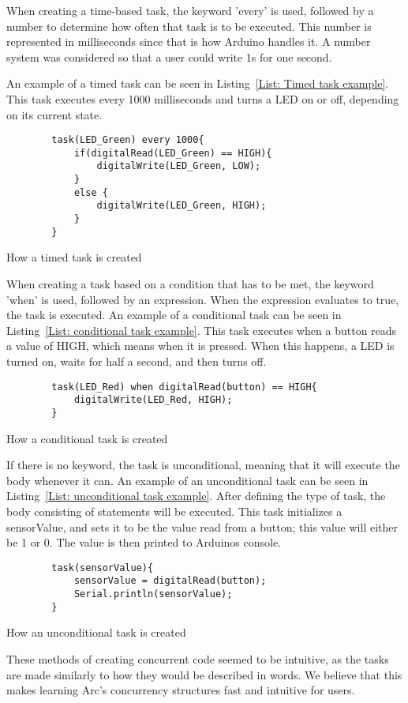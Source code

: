 When creating a time-based task, the keyword 'every' is used, followed by a number to determine how often that task is to be executed. This number is represented in milliseconds since that is how Arduino handles it. A number system was considered so that a user could write 1s for one second.

An example of a timed task can be seen in Listing~\ref{List: Timed task example}. This task executes every 1000 milliseconds and turns a LED on or off, depending on its current state.


\begin{listing}[htb!]
    \begin{verbatim}
        task(LED_Green) every 1000{
            if(digitalRead(LED_Green) == HIGH){
                digitalWrite(LED_Green, LOW);
            }
            else {
                digitalWrite(LED_Green, HIGH);
            }
        }
    \end{verbatim}
    \caption{How a timed task is created}
    \label{List: Timed task example}
\end{listing}


When creating a task based on a condition that has to be met, the keyword 'when' is used, followed by an expression. When the expression evaluates to true, the task is executed. An example of a conditional task can be seen in Listing~\ref{List: conditional task example}. This task executes when a button reads a value of HIGH, which means when it is pressed. When this happens, a LED is turned on, waits for half a second, and then turns off.


\begin{listing}[htb!]
    \begin{verbatim}
        task(LED_Red) when digitalRead(button) == HIGH{
            digitalWrite(LED_Red, HIGH);
        }
    \end{verbatim}
    \caption{How a conditional task is created}
    \label{List: conditional task example}
\end{listing}


If there is no keyword, the task is unconditional, meaning that it will execute the body whenever it can. An example of an unconditional task can be seen in Listing~\ref{List: unconditional task example}. After defining the type of task, the body consisting of statements will be executed. This task initializes a sensorValue, and sets it to be the value read from a button; this value will either be 1 or 0. The value is then printed to Arduinos console.


\begin{listing}[htb!]
    \begin{verbatim}
        task(sensorValue){
            sensorValue = digitalRead(button);
            Serial.println(sensorValue);
        }
    \end{verbatim}
    \caption{How an unconditional task is created}
    \label{List: unconditional task example}
\end{listing}


These methods of creating concurrent code seemed to be intuitive, as the tasks are made similarly to how they would be described in words. We believe that this makes learning Arc's concurrency structures fast and intuitive for users.
